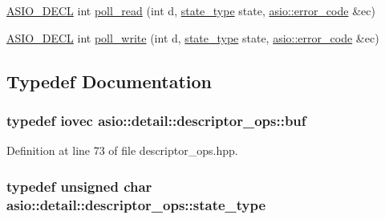 \begin{DoxyCompactItemize}
\item 
\hyperlink{config_8hpp_ab54d01ea04afeb9a8b39cfac467656b7}{A\+S\+I\+O\+\_\+\+D\+E\+C\+L} int \hyperlink{namespaceasio_1_1detail_1_1descriptor__ops_a3df8d319a2df8be7039a62bfb59686db}{poll\+\_\+read} (int d, \hyperlink{namespaceasio_1_1detail_1_1descriptor__ops_a773b997617ef697b51ff3f91f6e48764}{state\+\_\+type} state, \hyperlink{classasio_1_1error__code}{asio\+::error\+\_\+code} \&ec)
\item 
\hyperlink{config_8hpp_ab54d01ea04afeb9a8b39cfac467656b7}{A\+S\+I\+O\+\_\+\+D\+E\+C\+L} int \hyperlink{namespaceasio_1_1detail_1_1descriptor__ops_ab3ae5ba1bb1f565b3c62137fe56a3dbd}{poll\+\_\+write} (int d, \hyperlink{namespaceasio_1_1detail_1_1descriptor__ops_a773b997617ef697b51ff3f91f6e48764}{state\+\_\+type} state, \hyperlink{classasio_1_1error__code}{asio\+::error\+\_\+code} \&ec)
\end{DoxyCompactItemize}


\subsection{Typedef Documentation}
\hypertarget{namespaceasio_1_1detail_1_1descriptor__ops_ad10e658a754ff775cdcc3b3decd3c8c9}{}
\subsubsection[{buf}]{\setlength{\rightskip}{0pt plus 5cm}typedef iovec {\bf asio\+::detail\+::descriptor\+\_\+ops\+::buf}}\label{namespaceasio_1_1detail_1_1descriptor__ops_ad10e658a754ff775cdcc3b3decd3c8c9}


Definition at line 73 of file descriptor\+\_\+ops.\+hpp.

\hypertarget{namespaceasio_1_1detail_1_1descriptor__ops_a773b997617ef697b51ff3f91f6e48764}{}
\subsubsection[{state\+\_\+type}]{\setlength{\rightskip}{0pt plus 5cm}typedef unsigned char {\bf asio\+::detail\+::descriptor\+\_\+ops\+::state\+\_\+type}}\label{namespaceasio_1_1detail_1_1descriptor__ops_a773b997617ef697b51ff3f91f6e48764}


